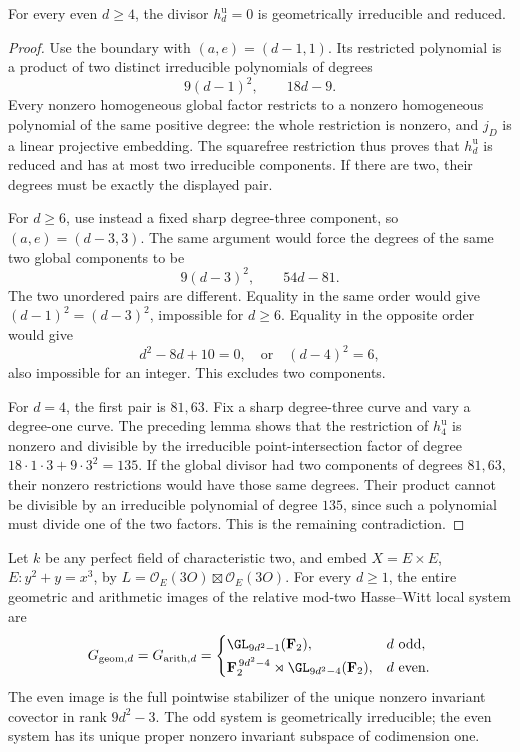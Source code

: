 \begin{theorem}
\label{thm:ss-even-unit-Hasse-irreducible-candidate}
For every even $d\ge4$, the divisor $h_d^{\mathrm u}=0$ is
geometrically irreducible and reduced.
\end{theorem}

\begin{proof}
Use the boundary with $(a,e)=(d-1,1)$. Its restricted
polynomial is a product of two distinct irreducible polynomials
of degrees
\[
                        9(d-1)^2,\qquad18d-9.
\]
Every nonzero homogeneous global factor restricts to a nonzero
homogeneous polynomial of the same positive degree: the whole
restriction is nonzero, and $j_D$ is a linear projective
embedding. The squarefree restriction thus proves that
$h_d^{\mathrm u}$ is reduced and has at most two irreducible
components. If there are two, their degrees must be exactly
the displayed pair.

For $d\ge6$, use instead a fixed sharp degree-three component,
so $(a,e)=(d-3,3)$. The same argument would force the degrees
of the same two global components to be
\[
                       9(d-3)^2,\qquad54d-81.
\]
The two unordered pairs are different. Equality in the same
order would give $(d-1)^2=(d-3)^2$, impossible for $d\ge6$.
Equality in the opposite order would give
\[
                  d^2-8d+10=0,
                  \quad\text{or}\quad(d-4)^2=6,
\]
also impossible for an integer. This excludes two components.

For $d=4$, the first pair is $81,63$.
Fix a sharp degree-three curve and vary a degree-one curve.
The preceding lemma shows that the restriction of $h_4^{\mathrm u}$
is nonzero and divisible by the irreducible point-intersection
factor of degree $18\cdot1\cdot3+9\cdot3^2=135$.
If the global divisor had two components of degrees $81,63$,
their nonzero restrictions would have those same degrees.
Their product cannot be divisible by an irreducible polynomial
of degree $135$, since such a polynomial must divide one of
the two factors. This is the remaining contradiction.
\end{proof}

\begin{theorem}
\label{thm:ss-product-all-full-groups-candidate}
Let $k$ be any perfect field of characteristic two, and embed
$X=E\times E$, $E:y^2+y=x^3$, by
$L=\mathcal O_E(3O)\boxtimes\mathcal O_E(3O)$.
For every $d\ge1$, the entire geometric and arithmetic images
of the relative mod-two Hasse--Witt local system are
\[
 G_{\mathrm{geom},d}=G_{\mathrm{arith},d}=
 \begin{cases}
 \GL_{9d^2-1}(\mathbf F_2),&d\text{ odd},\\[2pt]
 \mathbf F_2^{\,9d^2-4}\rtimes\GL_{9d^2-4}(\mathbf F_2),
                                      &d\text{ even}.
 \end{cases}
\]
The even image is the full pointwise stabilizer of the unique
nonzero invariant covector in rank $9d^2-3$. The odd system
is geometrically irreducible; the even system has its unique
proper nonzero invariant subspace of codimension one.
\end{theorem}

